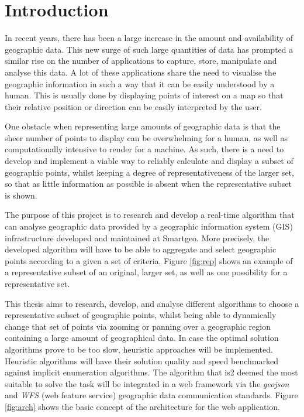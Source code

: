 \pagestyle{mypagestyle}

\setcounter{page}{1}

\cleardoublepage
\chapter{Introduction}
\label{chap:intro}

In recent years, there has been a large increase in the amount and availability of geographic data. This new surge of such large quantities of data has prompted a similar rise on the number of applications to capture, store, manipulate and analyse this data.
A lot of these applications share the need to visualise the geographic information in such a way that it can be easily understood by a human.
This is usually done by displaying points of interest on a map so that their relative position or direction can be easily interpreted by the user.

One obstacle when representing large amounts of geographic data is that the sheer number of points to display can be overwhelming for a human, as well as computationally intensive to render for a machine. As such, there is a need to develop and implement a viable way to reliably calculate and display a subset of geographic points, whilst keeping a degree of representativeness of the larger set, so that as little information as possible is absent when the representative subset is shown.

The purpose of this project is to research and develop a real-time algorithm that can analyse geographic data provided by a geographic information system (GIS) infrastructure developed and maintained at Smartgeo. More precisely, the developed algorithm will have to be able to aggregate and select geographic points according to a given a set of criteria. Figure \ref{fig:rep} shows an example of a representative subset of an original, larger set, as well as one possibility for a representative set.



This thesis aims to research, develop, and analyse different algorithms to choose a representative subset of geographic points, whilst being able to dynamically change that set of points via zooming or panning over a geographic region containing a large amount of geographical data. In case the optimal solution algorithms prove to be too slow, heuristic approaches will be implemented. Heuristic algorithms will have their solution quality and speed benchmarked against implicit enumeration algorithms.
The algorithm that is2 deemed the most suitable to solve the task will be integrated in a web framework via the \emph{geojson} and \emph{WFS} (web feature service) geographic data communication standards. Figure \ref{fig:arch} shows the basic concept of the architecture for the web application.

